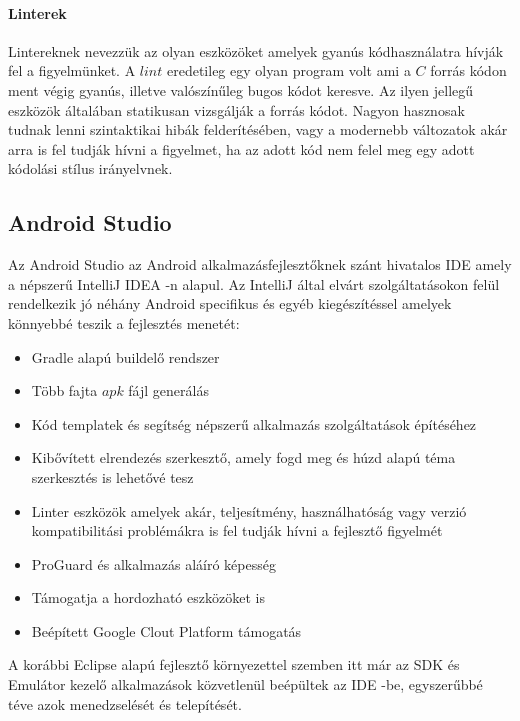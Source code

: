 \documentclass[12pt]{report}
\theoremstyle{definition}
\begin{document}
	\paragraph{Linterek} Lintereknek nevezzük az olyan eszközöket amelyek gyanús kódhasználatra hívják fel a figyelmünket. A $lint$ eredetileg egy olyan program volt ami a $C$ forrás kódon ment végig gyanús, illetve valószínűleg bugos kódot keresve. Az ilyen jellegű eszközök általában statikusan vizsgálják a forrás kódot. Nagyon hasznosak tudnak lenni szintaktikai hibák felderítésében, vagy a modernebb változatok akár arra is fel tudják hívni a figyelmet, ha az adott kód nem felel meg egy adott kódolási stílus irányelvnek.
	
	\subsection{Android Studio}
	Az Android Studio \cite{Android Studio} az Android alkalmazásfejlesztőknek szánt hivatalos IDE amely a népszerű IntelliJ IDEA -n alapul. Az IntelliJ által elvárt szolgáltatásokon felül rendelkezik jó néhány Android specifikus és egyéb kiegészítéssel amelyek könnyebbé teszik a fejlesztés menetét:
	
	\begin{itemize}
		\item Gradle alapú buildelő rendszer
		\item Több fajta $apk$ fájl generálás
		\item Kód templatek és segítség népszerű alkalmazás szolgáltatások építéséhez
		\item Kibővített elrendezés szerkesztő, amely fogd meg és húzd alapú téma szerkesztés is lehetővé tesz
		\item Linter eszközök amelyek akár, teljesítmény, használhatóság vagy verzió kompatibilitási problémákra is fel tudják hívni a fejlesztő figyelmét
		\item ProGuard és alkalmazás aláíró képesség
		\item Támogatja a hordozható eszközöket is
		\item Beépített Google Clout Platform támogatás
	\end{itemize}
	
	A korábbi Eclipse alapú fejlesztő környezettel szemben itt már az SDK és Emulátor kezelő alkalmazások közvetlenül beépültek az IDE -be, egyszerűbbé téve azok menedzselését és telepítését.
	
\end{document}
